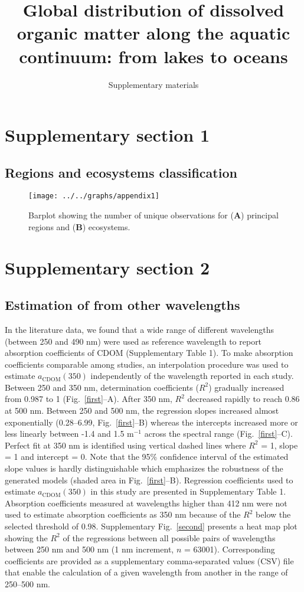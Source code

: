 \documentclass[12pt,a4paper]{scrartcl}
\title{Global distribution of dissolved organic matter along the aquatic continuum: from lakes to oceans}
\subtitle{Supplementary materials}
\date{}
\begin{document}
\maketitle

\section*{Supplementary section 1}
\subsection*{Regions and ecosystems classification}

\begin{figure}[H]
	\centering
	\texttt{[image: ../../graphs/appendix1]}
	\caption{Barplot showing the number of unique observations for (\textbf{A}) principal regions and (\textbf{B}) ecosystems.}
\end{figure}

\clearpage
\newpage

\section*{Supplementary section 2}
\subsection*{Estimation of  from other wavelengths}

In the literature data, we found that a wide range of different wavelengths (between 250 and 490 nm) were used as reference wavelength to report absorption coefficients of CDOM (Supplementary Table 1). To make absorption coefficients comparable among studies, an interpolation procedure was used to estimate $a_{\text{CDOM}}(350)$ independently of the wavelength reported in each study. Between 250 and 350 nm, determination coefficients ($R^2$) gradually increased from 0.987 to 1 (Fig.~\ref{first}--A). After 350 nm, $R^2$ decreased rapidly to reach 0.86 at 500 nm. Between 250 and 500 nm, the regression slopes increased almost exponentially (0.28--6.99, Fig.~\ref{first}--B) whereas the intercepts increased more or less linearly between -1.4 and 1.5 m$^{-1}$ across the spectral range (Fig.~\ref{first}--C). Perfect fit at 350 nm is identified using vertical dashed lines where $R^2$ = 1, slope = 1 and intercept = 0. Note that the 95\% confidence interval of the estimated slope values is hardly distinguishable which emphasizes the robustness of the generated models (shaded area in Fig.~\ref{first}--B). Regression coefficients used to estimate $a_{\text{CDOM}}(350)$ in this study are presented in Supplementary Table 1. Absorption coefficients measured at wavelengths higher than 412 nm were not used to estimate absorption coefficients as 350 nm because of the $R^2$ below the selected threshold of 0.98. Supplementary Fig.~\ref{second} presents a heat map plot showing the $R^2$ of the regressions between all possible pairs of wavelengths between 250 nm and 500 nm (1 nm increment, $n$ = 63001). Corresponding coefficients are provided as a supplementary comma-separated values (CSV) file that enable the calculation of a given wavelength from another in the range of 250--500 nm.
\end{document}
